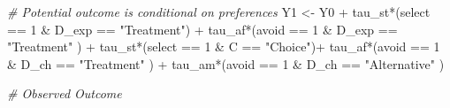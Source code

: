 \documentclass[
]{article}
\newenvironment{Shaded}{\begin{snugshade}}{\end{snugshade}}
\newcommand{\CommentTok}[1]{\textcolor[rgb]{0.56,0.35,0.01}{\textit{#1}}}
\newcommand{\DecValTok}[1]{\textcolor[rgb]{0.00,0.00,0.81}{#1}}
\newcommand{\NormalTok}[1]{#1}
\newcommand{\OtherTok}[1]{\textcolor[rgb]{0.56,0.35,0.01}{#1}}
\newcommand{\SpecialCharTok}[1]{\textcolor[rgb]{0.00,0.00,0.00}{#1}}
\newcommand{\StringTok}[1]{\textcolor[rgb]{0.31,0.60,0.02}{#1}}
\begin{document}
\begin{Shaded}
\begin{Highlighting}[]
  \CommentTok{\# Potential outcome is conditional on preferences}
\NormalTok{  Y1 }\OtherTok{\textless{}{-}}\NormalTok{ Y0 }\SpecialCharTok{+}\NormalTok{ tau\_st}\SpecialCharTok{*}\NormalTok{(select }\SpecialCharTok{==} \DecValTok{1} \SpecialCharTok{\&}\NormalTok{ D\_exp }\SpecialCharTok{==} \StringTok{"Treatment"}\NormalTok{) }\SpecialCharTok{+}\NormalTok{ tau\_af}\SpecialCharTok{*}\NormalTok{(avoid }\SpecialCharTok{==} \DecValTok{1} \SpecialCharTok{\&}\NormalTok{ D\_exp }\SpecialCharTok{==} \StringTok{"Treatment"}\NormalTok{ ) }\SpecialCharTok{+}
\NormalTok{    tau\_st}\SpecialCharTok{*}\NormalTok{(select }\SpecialCharTok{==} \DecValTok{1} \SpecialCharTok{\&}\NormalTok{ C }\SpecialCharTok{==} \StringTok{"Choice"}\NormalTok{)}\SpecialCharTok{+}
\NormalTok{    tau\_af}\SpecialCharTok{*}\NormalTok{(avoid }\SpecialCharTok{==} \DecValTok{1} \SpecialCharTok{\&}\NormalTok{ D\_ch }\SpecialCharTok{==} \StringTok{"Treatment"}\NormalTok{ ) }\SpecialCharTok{+}\NormalTok{ tau\_am}\SpecialCharTok{*}\NormalTok{(avoid }\SpecialCharTok{==} \DecValTok{1} \SpecialCharTok{\&}\NormalTok{ D\_ch }\SpecialCharTok{==} \StringTok{"Alternative"}\NormalTok{ )}
  
  
  
  \CommentTok{\# Observed Outcome}
  

\end{Highlighting}
\end{Shaded}
\end{document}
